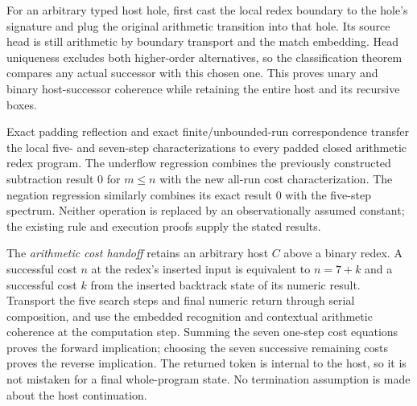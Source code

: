 

For an arbitrary typed host hole, first cast the local redex boundary to
the hole's signature and plug the original arithmetic transition into that
hole. Its source head is still arithmetic by boundary transport and the match
embedding. Head uniqueness excludes both higher-order alternatives, so the
classification theorem compares any actual successor with this chosen one.
This proves unary and binary host-successor coherence while retaining the
entire host and its recursive boxes.



Exact padding reflection and exact finite/unbounded-run correspondence
transfer the local five- and seven-step characterizations to every padded
closed arithmetic redex program. The underflow regression combines the
previously constructed subtraction result $0$ for $m\leq n$ with the new
all-run cost characterization. The negation regression similarly combines
its exact result $0$ with the five-step spectrum. Neither operation is replaced
by an observationally assumed constant; the existing rule and execution proofs
supply the stated results.





The \emph{arithmetic cost handoff} retains an arbitrary host $C$ above a binary
redex. A successful cost $n$ at the redex's inserted input is equivalent to
$n=7+k$ and a successful cost $k$ from the inserted backtrack state of its
numeric result. Transport the five search steps and final numeric return
through serial composition, and use the embedded recognition and contextual
arithmetic coherence at the computation step. Summing the seven one-step
cost equations proves the forward implication; choosing the seven successive
remaining costs proves the reverse implication. The returned token is internal
to the host, so it is not mistaken for a final whole-program state. No
termination assumption is made about the host continuation.

